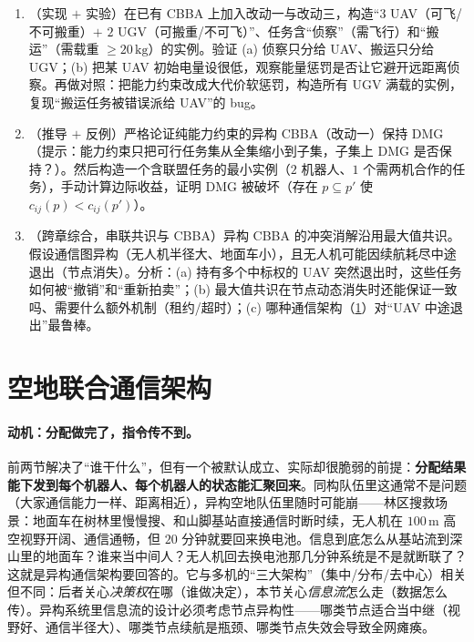 \begin{practice}
\begin{enumerate}
  \item （实现 $+$ 实验）在已有 CBBA 上加入改动一与改动三，构造“$3$ UAV（可飞/不可搬重）$+$ $2$ UGV（可搬重/不可飞）”、任务含“侦察”（需飞行）和“搬运”（需载重 $\ge 20\,\mathrm{kg}$）的实例。验证 (a) 侦察只分给 UAV、搬运只分给 UGV；(b) 把某 UAV 初始电量设很低，观察能量惩罚是否让它避开远距离侦察。再做对照：把能力约束改成大代价软惩罚，构造所有 UGV 满载的实例，复现“搬运任务被错误派给 UAV”的 bug。
  \item （推导 $+$ 反例）严格论证纯能力约束的异构 CBBA（改动一）保持 DMG（提示：能力约束只把可行任务集从全集缩小到子集，子集上 DMG 是否保持？）。然后构造一个含联盟任务的最小实例（$2$ 机器人、$1$ 个需两机合作的任务），手动计算边际收益，证明 DMG 被破坏（存在 $p\subseteq p'$ 使 $c_{ij}(p)<c_{ij}(p')$）。
  \item （跨章综合，串联共识与 CBBA）异构 CBBA 的冲突消解沿用最大值共识。假设通信图异构（无人机半径大、地面车小），且无人机可能因续航耗尽中途退出（节点消失）。分析：(a) 持有多个中标权的 UAV 突然退出时，这些任务如何被“撤销”和“重新拍卖”；(b) 最大值共识在节点动态消失时还能保证一致吗、需要什么额外机制（租约/超时）；(c) 哪种通信架构（\cref{sec:hmr-comm}）对“UAV 中途退出”最鲁棒。
\end{enumerate}
\end{practice}

\section{空地联合通信架构}
\label{sec:hmr-comm}

\paragraph{动机：分配做完了，指令传不到。}
前两节解决了“谁干什么”，但有一个被默认成立、实际却很脆弱的前提：\textbf{分配结果能下发到每个机器人、每个机器人的状态能汇聚回来}。同构队伍里这通常不是问题（大家通信能力一样、距离相近），异构空地队伍里随时可能崩——林区搜救场景：地面车在树林里慢慢搜、和山脚基站直接通信时断时续，无人机在 $100\,\mathrm{m}$ 高空视野开阔、通信通畅，但 $20$ 分钟就要回来换电池。信息到底怎么从基站流到深山里的地面车？谁来当中间人？无人机回去换电池那几分钟系统是不是就断联了？这就是异构通信架构要回答的。它与多机的“三大架构”（集中/分布/去中心）相关但不同：后者关心\emph{决策权}在哪（谁做决定），本节关心\emph{信息流}怎么走（数据怎么传）。异构系统里信息流的设计必须考虑节点异构性——哪类节点适合当中继（视野好、通信半径大）、哪类节点续航是瓶颈、哪类节点失效会导致全网瘫痪。

